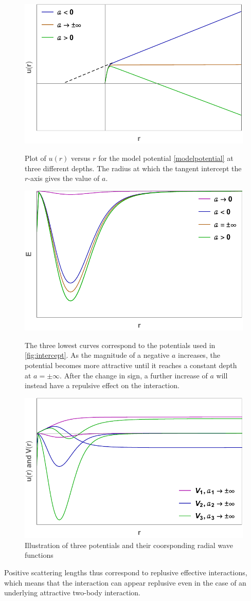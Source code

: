 \begin{figure}
	\centering
	\includegraphics[width=0.75\linewidth]{intercept}
	\caption{Plot of $u(r)$ versus $r$ for the model potential \eqref{modelpotential} at three different depths. The radius at which the tangent intercept the $r$-axis gives the value of $a$.}\label{fig:intercept}
	
	\vspace*{\floatsep}%
	
	\includegraphics[width=0.75\linewidth]{potential_depth}
	\caption{The three lowest curves correspond to the potentials used in \cref{fig:intercept}. As the magnitude of a negative $a$ increases, the potential becomes more attractive until it reaches a constant depth at $a=\pm\infty$. After the change in sign, a further increase of $a$ will instead have a repulsive effect on the interaction.}\label{fig:potential_depth} 
	
	\vspace*{\floatsep}%
	
	\includegraphics[width=0.75\linewidth]{scattapp}
	\caption{Illustration of three potentials and their coorsponding radial wave functions}\label{fig:scattapp}
\end{figure}
Positive scattering lengths thus correspond to replusive effective interactions, which means that the interaction can appear replusive even in the case of an underlying attractive two-body interaction.